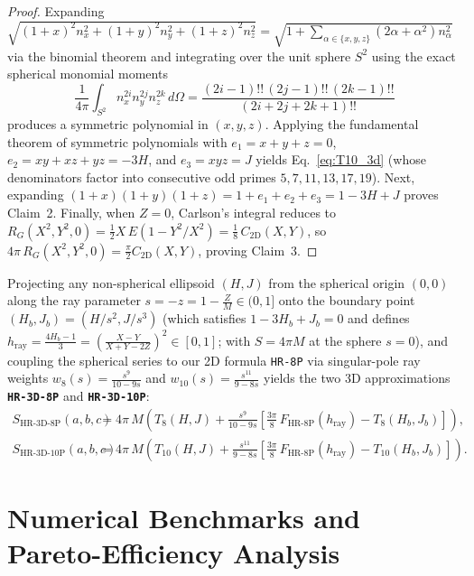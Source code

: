 \documentclass[11pt,a4paper]{article}
\theoremstyle{spacious}
\theoremstyle{spaciousdef}
\begin{document}
\begin{proof}
Expanding $\sqrt{(1+x)^2 n_x^2 + (1+y)^2 n_y^2 + (1+z)^2 n_z^2} = \sqrt{1 + \sum_{\alpha\in\{x,y,z\}}(2\alpha+\alpha^2)n_\alpha^2}$ via the binomial theorem and integrating over the unit sphere $S^2$ using the exact spherical monomial moments
\[
\frac{1}{4\pi}\int_{S^2} n_x^{2i} n_y^{2j} n_z^{2k}\,d\Omega = \frac{(2i-1)!!\,(2j-1)!!\,(2k-1)!!}{(2i+2j+2k+1)!!}
\]
produces a symmetric polynomial in $(x, y, z)$. Applying the fundamental theorem of symmetric polynomials with $e_1 = x+y+z = 0$, $e_2 = xy+xz+yz = -3H$, and $e_3 = xyz = J$ yields Eq.~\eqref{eq:T10_3d} (whose denominators factor into consecutive odd primes $5, 7, 11, 13, 17, 19$). Next, expanding $(1+x)(1+y)(1+z) = 1 + e_1 + e_2 + e_3 = 1 - 3H + J$ proves Claim~2. Finally, when $Z = 0$, Carlson's integral reduces to $R_G(X^2, Y^2, 0) = \tfrac{1}{2}X\,E(1 - Y^2/X^2) = \tfrac{1}{8}\,C_{\text{2D}}(X, Y)$, so $4\pi\,R_G(X^2, Y^2, 0) = \tfrac{\pi}{2}C_{\text{2D}}(X, Y)$, proving Claim~3.
\end{proof}

Projecting any non-spherical ellipsoid $(H, J)$ from the spherical origin $(0,0)$ along the ray parameter $s = -z = 1 - \frac{Z}{M} \in (0, 1]$ onto the boundary point $(H_b, J_b) = (H/s^2, J/s^3)$ (which satisfies $1 - 3H_b + J_b = 0$ and defines $h_{\text{ray}} = \frac{4H_b - 1}{3} = \left(\frac{X-Y}{X+Y-2Z}\right)^2 \in [0, 1]$; with $S = 4\pi M$ at the sphere $s = 0$), and coupling the spherical series to our 2D formula \texttt{HR-8P} via singular-pole ray weights $w_8(s) = \frac{s^9}{10 - 9s}$ and $w_{10}(s) = \frac{s^{11}}{9 - 8s}$ yields the two 3D approximations \textbf{\texttt{HR-3D-8P}} and \textbf{\texttt{HR-3D-10P}}:
\begin{align}
S_{\text{HR-3D-8P}}(a,b,c) &= 4\pi\,M \left( T_{8}(H, J) + \frac{s^{9}}{10 - 9s}\left[\frac{3\pi}{8}\,F_{\text{HR-8P}}(h_{\text{ray}}) - T_{8}(H_b, J_b)\right] \right), \label{eq:hr_3d_8p}\\
S_{\text{HR-3D-10P}}(a,b,c) &= 4\pi\,M \left( T_{10}(H, J) + \frac{s^{11}}{9 - 8s}\left[\frac{3\pi}{8}\,F_{\text{HR-8P}}(h_{\text{ray}}) - T_{10}(H_b, J_b)\right] \right). \label{eq:hr_3d_10p}
\end{align}

\section{Numerical Benchmarks and Pareto-Efficiency Analysis}
\end{document}

